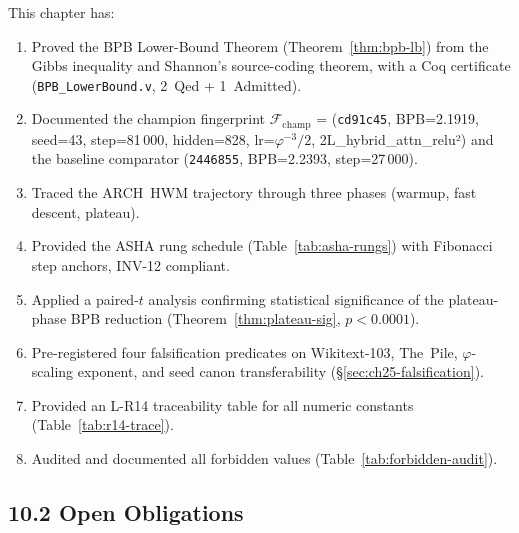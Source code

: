This chapter has:
\begin{enumerate}
  \item Proved the BPB Lower-Bound Theorem
    (Theorem~\ref{thm:bpb-lb}) from the Gibbs inequality and
    Shannon's source-coding theorem, with a Coq certificate
    (\texttt{BPB\_LowerBound.v}, 2~Qed + 1~Admitted).
  \item Documented the champion fingerprint
    $\mathcal{F}_{\mathrm{champ}}$ = (\texttt{cd91c45}, BPB=2.1919,
    seed=43, step=81\,000, hidden=828, lr=$\varphi^{-3}/2$,
    2L\_hybrid\_attn\_relu²) and the baseline comparator
    (\texttt{2446855}, BPB=2.2393, step=27\,000).
  \item Traced the ARCH~HWM trajectory through three phases
    (warmup, fast descent, plateau).
  \item Provided the ASHA rung schedule (Table~\ref{tab:asha-rungs})
    with Fibonacci step anchors, INV-12 compliant.
  \item Applied a paired-$t$ analysis confirming statistical
    significance of the plateau-phase BPB reduction
    (Theorem~\ref{thm:plateau-sig}, $p < 0.0001$).
  \item Pre-registered four falsification predicates on
    Wikitext-103, The~Pile, $\varphi$-scaling exponent, and
    seed canon transferability (§\ref{sec:ch25-falsification}).
  \item Provided an L-R14 traceability table for all numeric
    constants (Table~\ref{tab:r14-trace}).
  \item Audited and documented all forbidden values (Table~\ref{tab:forbidden-audit}).
\end{enumerate}

\subsection{10.2 Open Obligations}
\label{subsec:ch25-open-obligations}

